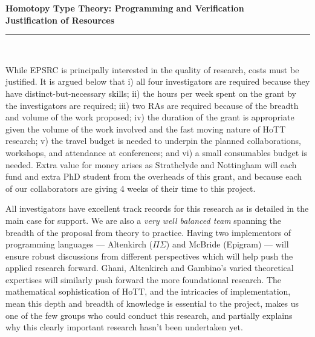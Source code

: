 \documentclass[a4paper,11pt]{article}
\begin{document}
\thispagestyle{plain}
\begin{center}
  {\Large \bf Homotopy Type Theory: Programming and Verification\\
\vspace{0.2in}
  Justification of Resources}\\[1ex]

\vspace*{-0.1in}

\rule{160mm}{.5mm}\\[2ex]
\end{center}

\noindent While EPSRC is principally interested in the quality of
research, costs must be justified. It is argued below that i) all four
investigators are required because they have
distinct-but-necessary skills; ii) the hours per week spent on
the grant by the investigators are required; iii)  two RAs are required because of the
breadth and volume of the work proposed; iv) the duration of the
grant is appropriate given the volume of the work involved and the
fast moving nature of HoTT research; v) the travel budget
is needed to underpin the planned collaborations, workshops, and
attendance at conferences; and vi) a small consumables budget is
needed. Extra value for money arises
as Strathclyde and Nottingham 
will each fund and extra PhD student from the overheads of this grant, and
because each of our collaborators are giving 4 weeks of their time to
this project.

\vspace{0.02in}

All investigators have excellent track records for this research as is
detailed in the main case for support.  We are also a {\em very well
  balanced team} spanning the breadth of the proposal from theory to
practice. Having two implementors of programming languages ---
Altenkirch ($\Pi\Sigma$) and McBride (Epigram) --- will ensure robust
discussions from different perspectives which will help push the
applied research forward. Ghani, Altenkirch and Gambino's varied
theoretical expertises will similarly push forward the more
foundational research. The mathematical sophistication of HoTT, and
the intricacies of implementation, mean this depth and breadth of
knowledge is essential to the project, makes us one of the few groups
who could conduct this research, and partially explains why this
clearly important research hasn't been undertaken yet.
\end{document}
